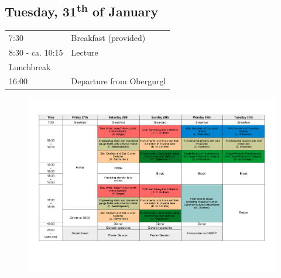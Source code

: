 \subsection*{Tuesday, 31\textsuperscript{th} of January}

\begin{tabular}{p{2.5cm}p{6cm}}
	7:30 & Breakfast (provided) \\
	8:30 - ca. 10:15 & Lecture \\ 
	\cline{1-2}
	Lunchbreak \\
	\cline{1-2}
	16:00 & Departure from Obergurgl \\ 
\end{tabular}
\vfill

\noindent

\begin{figure}
  \includegraphics[angle = 90,width=1.1\textwidth]{FinalProgram}
\end{figure}
